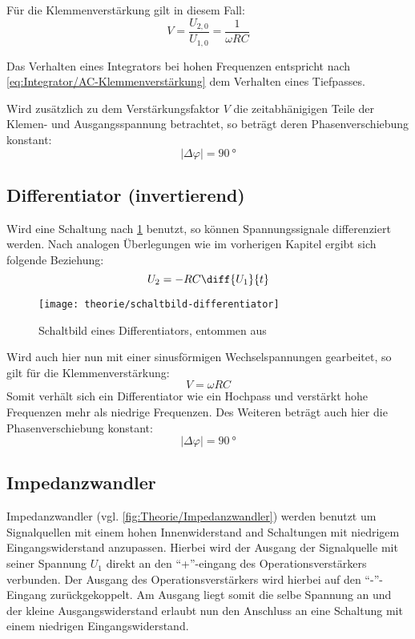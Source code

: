 Für die Klemmenverstärkung gilt in diesem Fall:
\begin{equation}\label{eq:Integrator/AC-Klemmenverstärkung}
	V = \dfrac{U_{2,0}}{U_{1,0}} = \dfrac{1}{\omega R C}
\end{equation}

Das Verhalten eines Integrators bei hohen Frequenzen entspricht nach
\cref{eq:Integrator/AC-Klemmenverstärkung} dem Verhalten eines
Tiefpasses.

Wird zusätzlich zu dem Verstärkungsfaktor $V$ die zeitabhänigigen Teile der
Klemen- und Ausgangsspannung betrachtet, so beträgt deren Phasenverschiebung
konstant:
\begin{equation}
	\left| \Delta \varphi \right| = \qty{90}{\degree}
\end{equation}

\subsection{Differentiator (invertierend)}
Wird eine Schaltung nach \cref{fig:Theorie/Differentiator} benutzt, so können
Spannungssignale differenziert werden. Nach analogen Überlegungen wie im 
vorherigen Kapitel ergibt sich folgende Beziehung:
\begin{equation}
	U_2 = - R C \diff{U_1}{t}
\end{equation}

\begin{figure}[H]
	\centering
	\texttt{[image: theorie/schaltbild-differentiator]}
	\caption{Schaltbild eines Differentiators, entommen
	aus \cite{script}}
	\label{fig:Theorie/Differentiator}
\end{figure}

Wird auch hier nun mit einer sinusförmigen Wechselspannungen gearbeitet, so
gilt für die Klemmenverstärkung:
\begin{equation}
	V = \omega R C
\end{equation}
Somit verhält sich ein Differentiator wie ein Hochpass und verstärkt hohe 
Frequenzen mehr als niedrige Frequenzen. Des Weiteren beträgt auch hier die
Phasenverschiebung konstant:
\begin{equation}
	\left| \Delta \varphi \right| = \qty{90}{\degree}
\end{equation}

\subsection{Impedanzwandler}
Impedanzwandler (vgl. \cref{fig:Theorie/Impedanzwandler}) werden benutzt um
Signalquellen mit einem hohen Innenwiderstand and Schaltungen mit niedrigem
Eingangswiderstand anzupassen. Hierbei wird der Ausgang der Signalquelle mit
seiner Spannung $U_1$ direkt an den "`+"'-eingang des Operationsverstärkers
verbunden. Der Ausgang des Operationsverstärkers wird hierbei auf den 
"`-"'-Eingang zurückgekoppelt. Am Ausgang liegt somit die selbe Spannung an und
der kleine Ausgangswiderstand erlaubt nun den Anschluss an eine Schaltung mit
einem niedrigen Eingangswiderstand.

